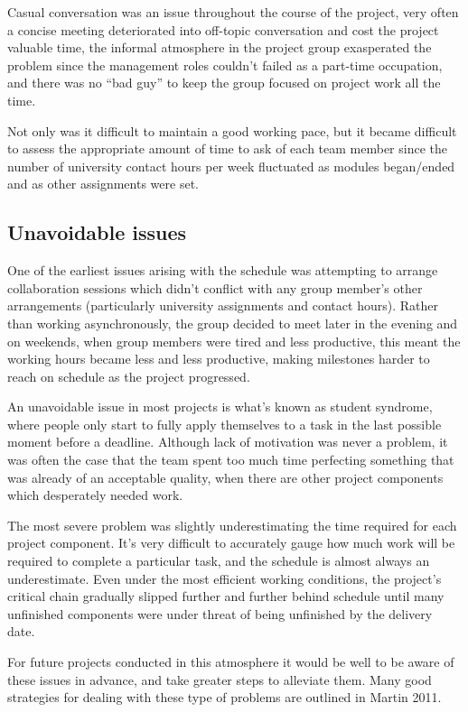 Casual conversation was an issue throughout the course of the project, very often a concise meeting deteriorated into off-topic conversation and cost the project valuable time, the informal atmosphere in the project group exasperated the problem since the management roles couldn't failed as a part-time occupation, and there was no ``bad guy'' to keep the group focused on project work all the time.

Not only was it difficult to maintain a good working pace, but it became difficult to assess the appropriate amount of time to ask of each team member since the number of university contact hours per week fluctuated as modules began/ended and as other assignments were set.

\subsection{Unavoidable issues}
One of the earliest issues arising with the schedule was attempting to arrange collaboration sessions which didn't conflict with any group member's other arrangements (particularly university assignments and contact hours). Rather than working asynchronously, the group decided to meet later in the evening and on weekends, when group members were tired and less productive, this meant the working hours became less and less productive, making milestones harder to reach on schedule as the project progressed.

An unavoidable issue in most projects is what's known as student syndrome, where people only start to fully apply themselves to a task in the last possible moment before a deadline.\cite{maylor2010} Although lack of motivation was never a problem, it was often the case that the team spent too much time perfecting something that was already of an acceptable quality, when there are other project components which desperately needed work.

The most severe problem was slightly underestimating the time required for each project component. It's very difficult to accurately gauge how much work will be required to complete a particular task, and the schedule is almost always an underestimate. Even under the most efficient working conditions, the project's critical chain gradually slipped further and further behind schedule until many unfinished components were under threat of being unfinished by the delivery date.\cite{goldratt}

For future projects conducted in this atmosphere it would be well to be aware of these issues in advance, and take greater steps to alleviate them. Many good strategies for dealing with these type of problems are outlined in Martin 2011.

